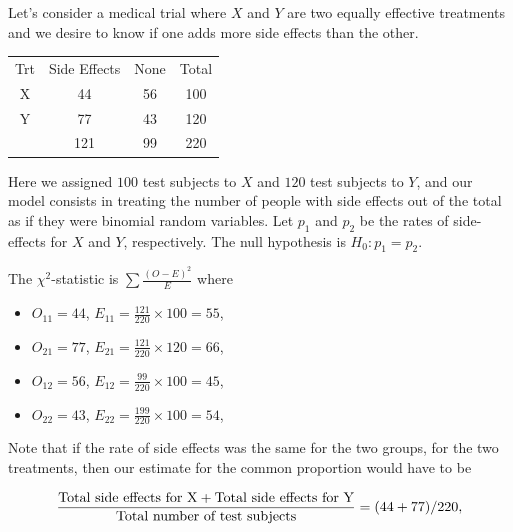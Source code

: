 \documentclass{homework}
\begin{document}
\begin{tcolorbox}[title=Example Chi-squared testing]

Let's consider a medical trial where $X$ and $Y$ are two equally effective treatments and we desire to know if one adds more side effects than the other. 

\begin{center}
\begin{tabular}{ |c|c|c|c| } 
 \hline
 Trt & Side Effects & None & Total \\ 
 X & 44 & 56 & 100 \\ 
 Y & 77 & 43 & 120 \\
 & 121 & 99 & 220
\end{tabular}
\end{center}

Here we assigned $100$ test subjects to $X$ and $120$ test subjects to $Y$, and our model consists in treating the number of people with side effects out of the total as if they were binomial random variables. Let $p_1$ and $p_2$ be the rates of side-effects for $X$ and $Y$, respectively. The null hypothesis is $H_0: p_1 = p_2$.

The $\chi^2$-statistic is $\sum \frac{(O-E)^2}{E}$ where

\begin{itemize}
    \item $O_{11}=44$, $E_{11} =\frac{121}{220}\times 100 = 55$, \\
    \item $O_{21}=77$, $E_{21} =\frac{121}{220}\times 120 = 66$, \\
    \item $O_{12}=56$, $E_{12} =\frac{99}{220}\times 100 = 45$, \\
    \item $O_{22}=43$, $E_{22} =\frac{199}{220}\times 100 = 54$,
\end{itemize}

Note that if the rate of side effects was the same for the two groups, for the two treatments, then our estimate for the common proportion would have to be 

$$
\frac{\textnormal{Total side effects for X}+\textnormal{Total side effects for Y}}{\textnormal{Total number of test subjects}}= (44+77)/220,
$$


\end{tcolorbox}
\end{document}
